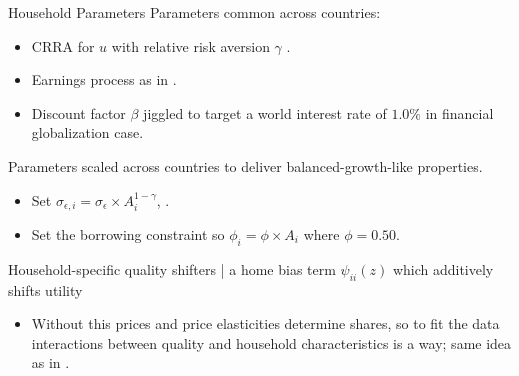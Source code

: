 \documentclass[9pt,pdftex,aspectratio=1610]{beamer}
\theoremstyle{definition}
\begin{document}

\begin{frame}[t]{Household Parameters}
\smallskip
Parameters common across countries:
\begin{itemize}
\smallskip
\item CRRA for $u$ with relative risk aversion $\gamma$ . \\
\smallskip
\item Earnings process as in \citet*{krueger2016macroeconomics}.
\smallskip
\item Discount factor $\beta$ jiggled to target a world interest rate of $1.0 \%$ in financial globalization case.
\end{itemize}
\bigskip
Parameters scaled across countries to deliver balanced-growth-like properties.
\begin{itemize}
\smallskip
\item Set $\sigma_{\epsilon,i} = \sigma_{\epsilon}\times A_i^{1-\gamma}$, .
\medskip
\item Set the borrowing constraint so $\phi_{i} = \phi \times A_i$ where $\phi = 0.50$.
\end{itemize}
\bigskip
Household-specific quality shifters | a home bias term $\psi_{ii}(z)$ which additively shifts utility
\begin{itemize}
\smallskip
\item Without this prices and price elasticities determine shares, so to fit the data interactions between quality and household characteristics is a way; same idea as in \citet{berry1995automobile}.
\smallskip
{}
\end{itemize}
\end{frame}

\end{document}
